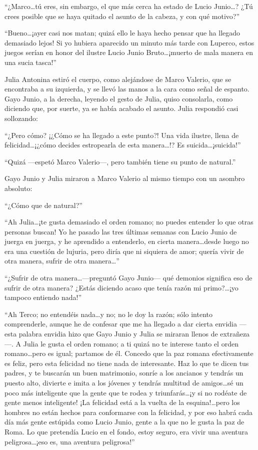 \documentclass[11pt,openany]{book}
\begin{document}
“¿Marco\dots tú eres, sin embargo, el que más cerca ha estado de Lucio Junio\dots? ¿Tú crees posible que se haya quitado el asunto de la cabeza, y con qué motivo?” 

“Bueno\dots ¡ayer casi nos matan; quizá ello le haya hecho pensar que ha llegado demasiado lejos! Si yo hubiera aparecido un minuto más tarde con Luperco, estos juegos serían en honor del ilustre Lucio Junio Bruto\dots ¡muerto de mala manera en una sucia tasca!” 

Julia Antonina estiró el cuerpo, como alejándose de Marco Valerio, que se encontraba a su izquierda, y se llevó las manos a la cara como señal de espanto. Gayo Junio, a la derecha, leyendo el gesto de Julia, quiso consolarla, como diciendo que, por suerte, ya se había acabado el asunto. Julia respondió casi sollozando: 

“¿Pero cómo? ¡¿Cómo se ha llegado a este punto?! Una vida ilustre, llena de felicidad\dots ¡¿cómo decides estropearla de esta manera\dots!? Es suicida\dots ¡suicida!” 

“Quizá —espetó Marco Valerio—, pero también tiene su punto de natural.” 

Gayo Junio y Julia miraron a Marco Valerio al mismo tiempo con un asombro absoluto: 

“¿Cómo que de natural?” 

“Ah Julia\dots ¡te gusta demasiado el orden romano; no puedes entender lo que otras personas buscan! Yo he pasado las tres últimas semanas con Lucio Junio de juerga en juerga, y he aprendido a entenderlo, en cierta manera\dots desde luego no era una cuestión de lujuria, pero diría que ni siquiera de amor; quería vivir de otra manera, sufrir de otra manera\dots” 

“¿Sufrir de otra manera\dots —preguntó Gayo Junio— qué demonios significa eso de sufrir de otra manera? ¿Estás diciendo acaso que tenía razón mi primo?\dots ¡yo tampoco entiendo nada!” 

“Ah Terco; no entendéis nada\dots y no; no le doy la razón; sólo intento comprenderle, aunque he de confesar que me ha llegado a dar cierta envidia —esta palabra envidia hizo que Gayo Junio y Julia se miraran llenos de extrañeza—. A Julia le gusta el orden romano; a ti quizá no te interese tanto el orden romano\dots pero es igual; partamos de él. Concedo que la paz romana efectivamente es feliz, pero esta felicidad no tiene nada de interesante. Haz lo que te dicen tus padres, y te buscarán un buen matrimonio, sonríe a los ancianos y tendrás un puesto alto, divierte e imita a los jóvenes y tendrás multitud de amigos\dots sé un poco más inteligente que la gente que te rodea y triunfarás\dots ¡y si no rodéate de gente menos inteligente! ¡La felicidad está a la vuelta de la esquina!\dots pero los hombres no están hechos para conformarse con la felicidad, y por eso habrá cada día más gente estúpida como Lucio Junio, gente a la que no le gusta la paz de Roma. Lo que pretendía Lucio en el fondo, estoy seguro, era vivir una aventura peligrosa\dots ¡eso es, una aventura peligrosa!” 
\end{document}
